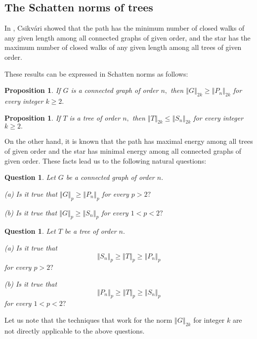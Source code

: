 \documentclass[12pt]{article}%
\newtheorem{proposition}[theorem]{Proposition}
\newtheorem{question}[theorem]{Question}
\begin{document}
\subsection{\label{Snt}The Schatten norms of trees}

In \cite{Csi10}, Csikv\'{a}ri showed that the path has the minimum number of
closed walks of any given length among all connected graphs of given order,
and the star has the maximum number of closed walks of any given length among
all trees of given order.

These results can be expressed in Schatten norms as follows:

\begin{proposition}
If $G$ is a connected graph of order $n,$ then $\left\Vert G\right\Vert
_{2k}\geq\left\Vert P_{n}\right\Vert _{2k}$ for every integer $k\geq2.$
\end{proposition}

\begin{proposition}
If $T$ is a tree of order $n,$ then $\left\Vert T\right\Vert _{2k}%
\leq\left\Vert S_{n}\right\Vert _{2k}$ for every integer $k\geq2.$
\end{proposition}

On the other hand, it is known that the path has maximal energy among all
trees of given order and the star has minimal energy among all connected
graphs of given order. These facts lead us to the following natural questions:

\begin{question}
Let $G$ be a connected graph of order $n.$

(a) Is it true that $\left\Vert G\right\Vert _{p}\geq\left\Vert P_{n}%
\right\Vert _{p}$ for every $p>2?$

(b) Is it true that $\left\Vert G\right\Vert _{p}\geq\left\Vert S_{n}%
\right\Vert _{p}$ for every $1<p<2?$
\end{question}

\begin{question}
Let $T$ be a tree of order $n.$

(a) Is it true that%
\[
\left\Vert S_{n}\right\Vert _{p}\geq\left\Vert T\right\Vert _{p}\geq\left\Vert
P_{n}\right\Vert _{p}%
\]
for every $p>2?$

(b) Is it true that
\[
\left\Vert P_{n}\right\Vert _{p}\geq\left\Vert T\right\Vert _{p}\geq\left\Vert
S_{n}\right\Vert _{p}%
\]
for every $1<p<2?$
\end{question}

Let us note that the techniques that work for the norm $\left\Vert
G\right\Vert _{2k}$ for integer $k$ are not directly applicable to the above questions.
\end{document}
